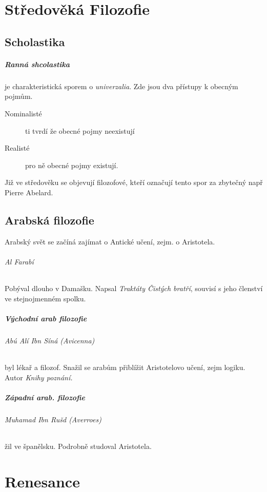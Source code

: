 \documentclass[10pt,a4paper,
twoside,%
]{report}
\begin{document}
\chapter{Středověká Filozofie}

\section{Scholastika}
\paragraph{Ranná shcolastika} je charakteristická sporem o \emph{univerzalia}. Zde jsou dva přístupy k obecným pojmům. 

\begin{description}
  \item[Nominalisté] ti tvrdí že obecné pojmy neexistují 
  \item[Realisté] pro ně obecné pojmy existují. 
\end{description}

Již ve středověku se objevují filozofové, kteří označují tento spor za zbytečný např \textsf{Pierre Abelard.}

\section{Arabská filozofie}

Arabský svět se začíná zajímat o Antické učení, zejm. o Aristotela. 

\subparagraph{Al Farabí} Pobýval dlouho v Damašku. Napsal \emph{Traktáty Čistých bratří}, souvisí s jeho členství ve stejnojmenném spolku. 

\paragraph{Východní arab filozofie }

\subparagraph{Abú Alí Ibn Síná (\emph{Avicenna})} byl lékař a filozof. Snažil se arabům přiblížit Aristotelovo učení, zejm logiku. Autor \emph{Knihy poznání.}

\paragraph{Západní arab. filozofie}

\subparagraph{Muhamad Ibn Rušd (\emph{Averroes})} žil ve španělsku. Podrobně studoval Aristotela.


\chapter{Renesance}
\end{document}
